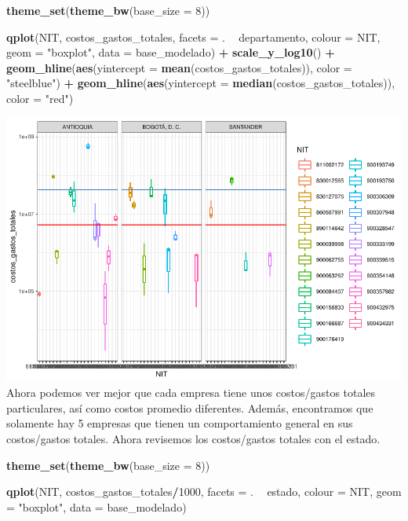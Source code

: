 \documentclass[
  11pt,
  a4paper,
]{book}
\newenvironment{Shaded}{\begin{snugshade}}{\end{snugshade}}
\newcommand{\DataTypeTok}[1]{\textcolor[rgb]{0.13,0.29,0.53}{#1}}
\newcommand{\DecValTok}[1]{\textcolor[rgb]{0.00,0.00,0.81}{#1}}
\newcommand{\KeywordTok}[1]{\textcolor[rgb]{0.13,0.29,0.53}{\textbf{#1}}}
\newcommand{\NormalTok}[1]{#1}
\newcommand{\OperatorTok}[1]{\textcolor[rgb]{0.81,0.36,0.00}{\textbf{#1}}}
\newcommand{\StringTok}[1]{\textcolor[rgb]{0.31,0.60,0.02}{#1}}
\begin{document}
\begin{Shaded}
\begin{Highlighting}[]
\KeywordTok{theme_set}\NormalTok{(}\KeywordTok{theme_bw}\NormalTok{(}\DataTypeTok{base_size =} \DecValTok{8}\NormalTok{))}

\KeywordTok{qplot}\NormalTok{(NIT, costos_gastos_totales, }\DataTypeTok{facets =}\NormalTok{ . }\OperatorTok{~}\StringTok{ }\NormalTok{departamento, }
      \DataTypeTok{colour =}\NormalTok{ NIT, }\DataTypeTok{geom =} \StringTok{"boxplot"}\NormalTok{, }\DataTypeTok{data =}\NormalTok{ base_modelado) }\OperatorTok{+}
\StringTok{  }\KeywordTok{scale_y_log10}\NormalTok{() }\OperatorTok{+}\StringTok{ }
\StringTok{  }\KeywordTok{geom_hline}\NormalTok{(}\KeywordTok{aes}\NormalTok{(}\DataTypeTok{yintercept =} \KeywordTok{mean}\NormalTok{(costos_gastos_totales)), }\DataTypeTok{color =} \StringTok{"steelblue"}\NormalTok{) }\OperatorTok{+}
\StringTok{  }
\StringTok{  }\KeywordTok{geom_hline}\NormalTok{(}\KeywordTok{aes}\NormalTok{(}\DataTypeTok{yintercept =} \KeywordTok{median}\NormalTok{(costos_gastos_totales)), }\DataTypeTok{color =} \StringTok{"red"}\NormalTok{)}
\end{Highlighting}
\end{Shaded}

\includegraphics{index_files/figure-latex/unnamed-chunk-54-1.pdf} Ahora
podemos ver mejor que cada empresa tiene unos costos/gastos totales
particulares, así como costos promedio diferentes. Además, encontramos
que solamente hay 5 empresas que tienen un comportamiento general en sus
costos/gastos totales. Ahora revisemos los costos/gastos totales con el
estado.

\begin{Shaded}
\begin{Highlighting}[]
\KeywordTok{theme_set}\NormalTok{(}\KeywordTok{theme_bw}\NormalTok{(}\DataTypeTok{base_size =} \DecValTok{8}\NormalTok{))}

\KeywordTok{qplot}\NormalTok{(NIT, costos_gastos_totales}\OperatorTok{/}\DecValTok{1000}\NormalTok{, }\DataTypeTok{facets =}\NormalTok{ . }\OperatorTok{~}\StringTok{ }\NormalTok{estado, }
      \DataTypeTok{colour =}\NormalTok{ NIT, }\DataTypeTok{geom =} \StringTok{"boxplot"}\NormalTok{, }\DataTypeTok{data =}\NormalTok{ base_modelado) }
\end{Highlighting}
\end{Shaded}
\end{document}
